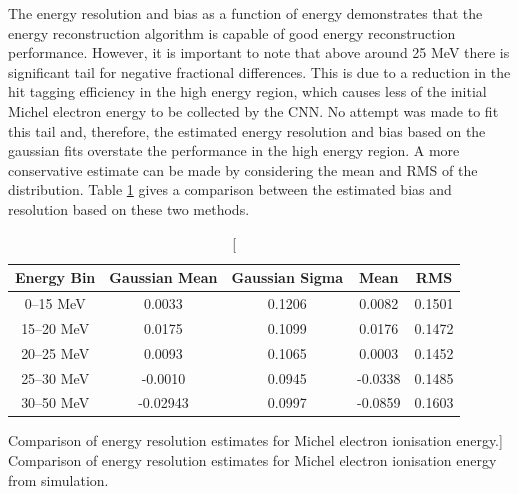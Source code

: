 The energy resolution and bias as a function of energy demonstrates that the
energy reconstruction algorithm is capable of good energy reconstruction
performance. However, it is important to note that above around 25 MeV there is
significant tail for negative fractional differences. This is due to a reduction
in the hit tagging efficiency in the high energy region, which causes less of
the initial Michel electron energy to be collected by the CNN. No attempt was
made to fit this tail and, therefore, the estimated energy resolution and bias
based on the gaussian fits overstate the performance in the high energy region. 
A more conservative estimate can be made by considering the mean and RMS of the 
distribution. Table \ref{tab:gaus_v_mean} gives a comparison between the 
estimated bias and resolution based on these two methods.
\begin{table}
	\centering
	\bgroup
	\def\arraystretch{1.5}
	\begin{tabular}{c|c|c|c|c}
		Energy Bin & Gaussian Mean & Gaussian Sigma & Mean    & RMS    \\ \hline
		0--15 MeV  & 0.0033        & 0.1206         & 0.0082  & 0.1501 \\
		15--20 MeV & 0.0175        & 0.1099         & 0.0176  & 0.1472 \\
		20--25 MeV & 0.0093        & 0.1065         & 0.0003  & 0.1452 \\
		25--30 MeV & -0.0010       & 0.0945         & -0.0338 & 0.1485 \\
		30--50 MeV & -0.02943      & 0.0997         & -0.0859 & 0.1603 \\
	\end{tabular}
	\egroup
	\caption
	[Comparison of energy resolution estimates for Michel electron ionisation
	energy.]
	{ Comparison of energy resolution estimates for Michel electron ionisation
	energy from \protodune{} simulation. }
	\label{tab:gaus_v_mean}
\end{table}

